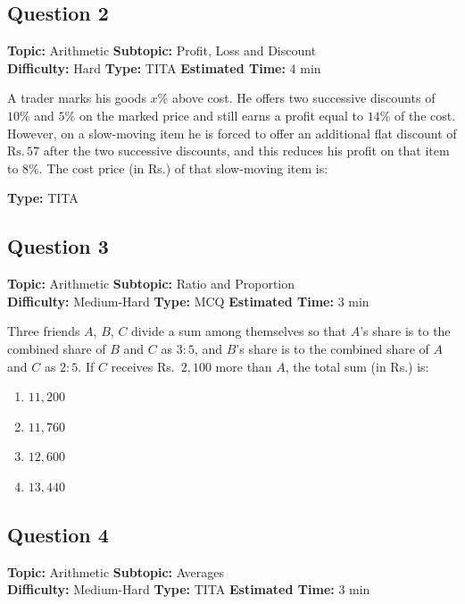 \documentclass[11pt]{article}
\begin{document}
\subsection*{Question 2}
\textbf{Topic:} Arithmetic \quad \textbf{Subtopic:} Profit, Loss and Discount \\
\textbf{Difficulty:} Hard \quad \textbf{Type:} TITA \quad \textbf{Estimated Time:} 4 min

\begin{tcolorbox}
A trader marks his goods \(x\%\) above cost. He offers two successive discounts of \(10\%\) and \(5\%\) on the marked price and still earns a profit equal to \(14\%\) of the cost. However, on a slow-moving item he is forced to offer an additional flat discount of \(\mathrm{Rs.}\,57\) after the two successive discounts, and this reduces his profit on that item to \(8\%\). The cost price (in Rs.) of that slow-moving item is:
\end{tcolorbox}

\textbf{Type:} TITA

\subsection*{Question 3}
\textbf{Topic:} Arithmetic \quad \textbf{Subtopic:} Ratio and Proportion \\
\textbf{Difficulty:} Medium-Hard \quad \textbf{Type:} MCQ \quad \textbf{Estimated Time:} 3 min

\begin{tcolorbox}
Three friends \(A\), \(B\), \(C\) divide a sum among themselves so that \(A\)'s share is to the combined share of \(B\) and \(C\) as \(3:5\), and \(B\)'s share is to the combined share of \(A\) and \(C\) as \(2:5\). If \(C\) receives Rs.~\(2{,}100\) more than \(A\), the total sum (in Rs.) is:
\end{tcolorbox}

\begin{enumerate}[label=(\Alph*)]
    \item \(11{,}200\)
    \item \(11{,}760\)
    \item \(12{,}600\)
    \item \(13{,}440\)
\end{enumerate}

\subsection*{Question 4}
\textbf{Topic:} Arithmetic \quad \textbf{Subtopic:} Averages \\
\textbf{Difficulty:} Medium-Hard \quad \textbf{Type:} TITA \quad \textbf{Estimated Time:} 3 min
\end{document}
